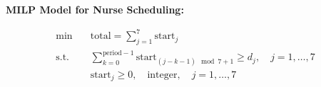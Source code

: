 \documentclass{article}
\begin{document}
\textbf{MILP Model for Nurse Scheduling:}

\begin{align*}
\min \quad & \text{total} = \sum_{j=1}^{7} \text{start}_j \\
\text{s.t.} \quad & \sum_{k=0}^{\text{period}-1} \text{start}_{(j-k-1) \mod 7 + 1} \geq d_j, \quad j = 1, \ldots, 7 \\
& \text{start}_j \geq 0, \quad \text{integer}, \quad j = 1, \ldots, 7 \\
\end{align*}
\end{document}
